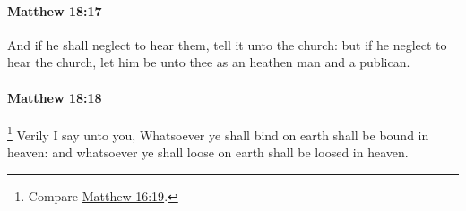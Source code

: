 		\paragraph{Matthew 18:17} %
			\label{MATTHEW-18-17}

			And if he shall neglect to hear them, tell it unto the church: but if he neglect to hear the church, let him be unto thee as an heathen man and a publican.

			\begin{framed}
			\scriptsize
				\begin{compactdesc}
					\item[SBLG] 
				\end{compactdesc}
			\end{framed}

		\paragraph{Matthew 18:18} %
			\label{MATTHEW-18-18}

				\footnote{%
					Compare \hyperref[MATTHEW-16-19]{Matthew 16:19}.
					}%
			Verily I say unto you, Whatsoever ye shall bind on earth shall be bound in heaven: and whatsoever ye shall loose on earth shall be loosed in heaven.

